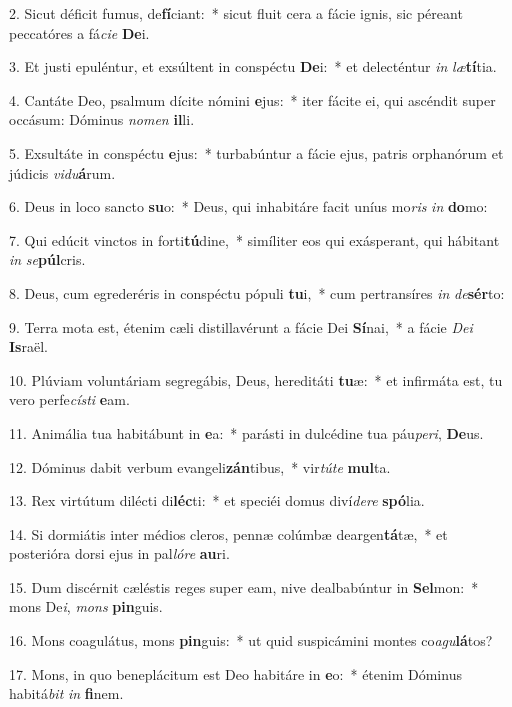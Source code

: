 2. Sicut déficit fumus, de\textbf{fí}ciant:~*  sicut fluit cera a fácie ignis, sic péreant peccatóres a fá\textit{ci}\textit{e} \textbf{De}i.\

3. Et justi epuléntur, et exsúltent in conspéctu \textbf{De}i:~*  et delecténtur \textit{in} \textit{læ}\textbf{tí}tia.\

4. Cantáte Deo, psalmum dícite nómini \textbf{e}jus:~*  iter fácite ei, qui ascéndit super occásum: Dóminus \textit{no}\textit{men} \textbf{il}li.\

5. Exsultáte in conspéctu \textbf{e}jus:~*  turbabúntur a fácie ejus, patris orphanórum et júdicis \textit{vi}\textit{du}\textbf{á}rum.\

6. Deus in loco sancto \textbf{su}o:~*  Deus, qui inhabitáre facit uníus mo\textit{ris} \textit{in} \textbf{do}mo:\

7. Qui edúcit vinctos in forti\textbf{tú}dine,~*  simíliter eos qui exásperant, qui hábitant \textit{in} \textit{se}\textbf{púl}cris.\

8. Deus, cum egrederéris in conspéctu pópuli \textbf{tu}i,~*  cum pertransíres \textit{in} \textit{de}\textbf{sér}to:\

9. Terra mota est, étenim cæli distillavérunt a fácie Dei \textbf{Sí}nai,~*  a fácie \textit{De}\textit{i} \textbf{Is}raël.\

10. Plúviam voluntáriam segregábis, Deus, hereditáti \textbf{tu}æ:~*  et infirmáta est, tu vero perfe\textit{cís}\textit{ti} \textbf{e}am.\

11. Animália tua habitábunt in \textbf{e}a:~*  parásti in dulcédine tua páu\textit{pe}\textit{ri}, \textbf{De}us.\

12. Dóminus dabit verbum evangeli\textbf{zán}tibus,~*  vir\textit{tú}\textit{te} \textbf{mul}ta.\

13. Rex virtútum dilécti di\textbf{léc}ti:~*  et speciéi domus diví\textit{de}\textit{re} \textbf{spó}lia.\

14. Si dormiátis inter médios cleros, pennæ colúmbæ deargen\textbf{tá}tæ,~*  et posterióra dorsi ejus in pal\textit{ló}\textit{re} \textbf{au}ri.\

15. Dum discérnit cæléstis reges super eam, nive dealbabúntur in \textbf{Sel}mon:~*  mons De\textit{i}, \textit{mons} \textbf{pin}guis.\

16. Mons coagulátus, mons \textbf{pin}guis:~*  ut quid suspicámini montes co\textit{a}\textit{gu}\textbf{lá}tos?\

17. Mons, in quo beneplácitum est Deo habitáre in \textbf{e}o:~*  étenim Dóminus habitá\textit{bit} \textit{in} \textbf{fi}nem.\

